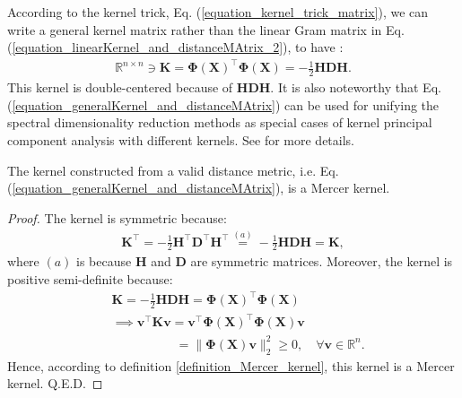 \documentclass[lang=cn,10pt]{gorgeousnbook}
\numberwithin{equation}{section}%
\numberwithin{figure}{section}%
\begin{document}
According to the kernel trick, Eq. (\ref{equation_kernel_trick_matrix}), we can write a general kernel matrix rather than the linear Gram matrix in Eq. (\ref{equation_linearKernel_and_distanceMAtrix_2}), to have \cite{cox2008multidimensional}:
\begin{align}\label{equation_generalKernel_and_distanceMAtrix}
\mathbb{R}^{n \times n} \ni \boldsymbol{K} = \boldsymbol{\Phi}(\boldsymbol{X})^\top \boldsymbol{\Phi}(\boldsymbol{X}) = -\frac{1}{2} \boldsymbol{HDH}.
\end{align}
This kernel is double-centered because of $\boldsymbol{HDH}$.  
It is also noteworthy that Eq. (\ref{equation_generalKernel_and_distanceMAtrix}) can be used for unifying the spectral dimensionality reduction methods as special cases of kernel principal component analysis with different kernels. See \cite{ham2004kernel,bengio2004learning} for more details. 

\begin{lemma}
The kernel constructed from a valid distance metric, i.e. Eq. (\ref{equation_generalKernel_and_distanceMAtrix}), is a Mercer kernel. 
\end{lemma}
\begin{proof}
The kernel is symmetric because:
\begin{align*}
\boldsymbol{K}^\top = -\frac{1}{2} \boldsymbol{H}^\top \boldsymbol{D}^\top \boldsymbol{H}^\top \overset{(a)}{=} -\frac{1}{2} \boldsymbol{HDH} = \boldsymbol{K},
\end{align*}
where $(a)$ is because $\boldsymbol{H}$ and $\boldsymbol{D}$ are symmetric matrices. 
Moreover, the kernel is positive semi-definite because:
\begin{align*}
&\boldsymbol{K} = -\frac{1}{2} \boldsymbol{HDH} = \boldsymbol{\Phi}(\boldsymbol{X})^\top \boldsymbol{\Phi}(\boldsymbol{X}) \\
&\implies \boldsymbol{v}^\top \boldsymbol{K} \boldsymbol{v} = \boldsymbol{v}^\top \boldsymbol{\Phi}(\boldsymbol{X})^\top \boldsymbol{\Phi}(\boldsymbol{X}) \boldsymbol{v} \\
&~~~~~~~~~~~~~~~~~~~~~~~ = \|\boldsymbol{\Phi}(\boldsymbol{X}) \boldsymbol{v}\|_2^2 \geq 0, \quad \forall \boldsymbol{v} \in \mathbb{R}^n. 
\end{align*}
Hence, according to definition \ref{definition_Mercer_kernel}, this kernel is a Mercer kernel. Q.E.D.
\end{proof}
\end{document}
